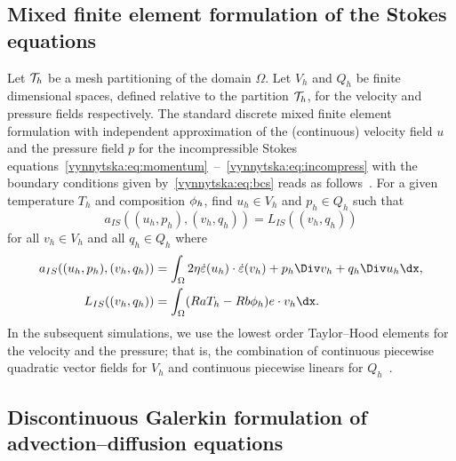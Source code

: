 \subsection{Mixed finite element formulation of the Stokes equations}

Let $\mathcal{T}_h$ be a mesh partitioning of the domain $\Omega$. Let
$V_h$ and $Q_h$ be finite dimensional spaces, defined relative to the
partition $\mathcal{T}_h$, for the velocity and pressure fields
respectively. The standard discrete mixed finite element formulation
with independent approximation of the (continuous) velocity field $u$
and the pressure field $p$ for the incompressible Stokes
equations~\eqref{vynnytska:eq:momentum}~--~\eqref{vynnytska:eq:incompress}
with the boundary conditions given by~\eqref{vynnytska:eq:bcs} reads
as follows~\citep{ZienkiewiczTaylor2000}. For a given temperature
$T_h$ and composition $\phi_h$, find $u_h \in V_h$ and $p_h
\in Q_h$ such that
\begin{equation}
  \label{vynnytska:eq:mixed}
  a_{IS} ( (u_h, p_h), (v_h, q_h) ) = L_{IS} ( (v_h, q_h) )
\end{equation}
for all $v_h \in V_h$ and all $q_h \in Q_h$ where
\begin{align}
  a_{IS} ( (u_h, p_h), (v_h, q_h) )
  & =
  \int_{\Omega} 2 \eta \dot {\varepsilon}(u_h)  \cdot \dot {\varepsilon}(v_h)
  + p_h \Div v_h + q_h \Div u_h \dx, \\
  L_{IS} ( (v_h, q_h) ) &=
  \int_{\Omega} ( Ra T_h - Rb \composition_{h} ) e \cdot v_h  \dx.
\end{align}
In the subsequent simulations, we use the lowest order Taylor--Hood
elements for the velocity and the pressure; that is, the combination
of continuous piecewise quadratic vector fields for $V_h$ and
continuous piecewise linears for $Q_h$~\citep{TaylorHood1973}.

\subsection{Discontinuous Galerkin formulation of advection--diffusion equations}

